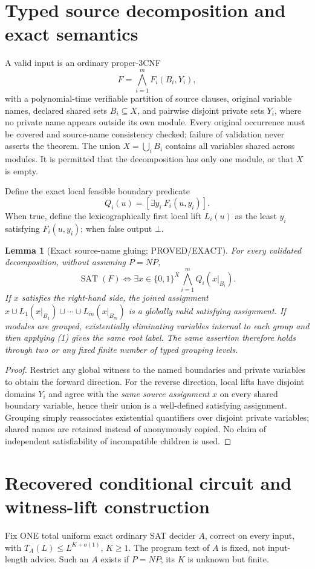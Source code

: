 \documentclass[11pt]{article}
\newtheorem{lemma}[theorem]{Lemma}
\newcommand{\SAT}{\operatorname{SAT}}
\begin{document}
\section{Typed source decomposition and exact semantics}
A valid input is an ordinary proper-3CNF
\[
F=\bigwedge_{i=1}^m F_i(B_i,Y_i),
\]
with a polynomial-time verifiable partition of source clauses, original variable names, declared shared sets \(B_i\subseteq X\), and pairwise disjoint private sets \(Y_i\), where no private name appears outside its own module. Every original occurrence must be covered and source-name consistency checked; failure of validation never asserts the theorem. The union \(X=\bigcup_i B_i\) contains all variables shared across modules. It is permitted that the decomposition has only one module, or that \(X\) is empty.

Define the exact local feasible boundary predicate
\[
Q_i(u)=[\exists y_i\ F_i(u,y_i)].
\]
When true, define the lexicographically first local lift \(L_i(u)\) as the least \(y_i\) satisfying \(F_i(u,y_i)\); when false output \(\bot\).

\begin{lemma}[Exact source-name gluing; PROVED/EXACT]
For every validated decomposition, without assuming \(P=NP\),
\[
\boxed{\SAT(F)\iff
\exists x\in\{0,1\}^{X}
\bigwedge_{i=1}^m Q_i(x|_{B_i})}.
\tag{1}
\]
If \(x\) satisfies the right-hand side, the joined assignment
\(x\cup L_1(x|_{B_1})\cup\cdots\cup L_m(x|_{B_m})\)
is a globally valid satisfying assignment. If modules are grouped, existentially eliminating variables internal to each group and then applying (1) gives the same root label. The same assertion therefore holds through two or any fixed finite number of typed grouping levels.
\end{lemma}
\begin{proof}
Restrict any global witness to the named boundaries and private variables to obtain the forward direction. For the reverse direction, local lifts have disjoint domains \(Y_i\) and agree with the \emph{same source assignment} \(x\) on every shared boundary variable, hence their union is a well-defined satisfying assignment. Grouping simply reassociates existential quantifiers over disjoint private variables; shared names are retained instead of anonymously copied. No claim of independent satisfiability of incompatible children is used.
\end{proof}

\section{Recovered conditional circuit and witness-lift construction}
Fix ONE total uniform exact ordinary SAT decider \(A\), correct on every input, with \(T_A(L)\le L^{K+o(1)}\), \(K\ge1\). The program text of \(A\) is fixed, not input-length advice. Such an \(A\) exists if \(P=NP\); its \(K\) is unknown but finite.
\end{document}
